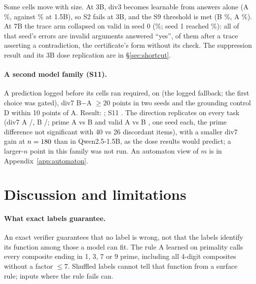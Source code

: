 \documentclass{article}
\theoremstyle{definition}
\begin{document}
Some cells move with size. At 3B, div3 becomes learnable from answers alone (A \threeBdivthreeA\%, against \divthreeA\% at 1.5B), so S2 fails at 3B, and the S9 threshold is met (B \threeBdivthirteenBnThreeSixtysZero\%, A \threeBdivthirteenAnThreeSixtysZero\%). At 7B the trace arm collapsed on valid in seed 0 (\sevenBvalidBsZero\%; seed 1 reached \sevenBvalidBsOne\%): all \sevenBvalidBerrYes{} of that seed's \sevenBvalidBerrN{} errors are invalid arguments answered ``yes'', \sevenBvalidBerrTemplate{} of them after a trace asserting a contradiction, the certificate's form without its check. The suppression result and its 3B dose replication are in \S\ref{sec:shortcut}.

\paragraph{A second model family (S11).} A prediction logged before its cells ran required, on \secondFamilyModel{} (the logged fallback; the first choice was gated), div7 B$-$A $\ge20$ points in two seeds and the grounding control D within 10 points of A. Result: \SElevenResult; S11 \SElevenVerdict. The direction replicates on every task (div7 A \famDivsevenAsZero/\famDivsevenAsOne, B \famDivsevenBsZero/\famDivsevenBsOne; prime A \famPrimeAsZero{} vs B \famPrimeBsZero{} and valid A \famValidAsZero{} vs B \famValidBsZero, one seed each, the prime difference not significant with 40 vs 26 discordant items), with a smaller div7 gain at $n=180$ than in Qwen2.5-1.5B, as the dose results would predict; a larger-$n$ point in this family was not run. An automaton view of $m$ is in Appendix~\ref{app:automaton}.

\section{Discussion and limitations}
\label{sec:discussion}
\paragraph{What exact labels guarantee.} An exact verifier guarantees that no label is wrong, not that the labels identify its function among those a model can fit. The rule A learned on primality calls every composite ending in 1, 3, 7 or 9 prime, including all \hardNegPop{} 4-digit composites without a factor $\le 7$. Shuffled labels cannot tell that function from a surface rule; inputs where the rule fails can.
\end{document}
